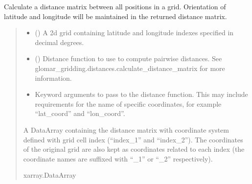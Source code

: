 \documentclass[letterpaper,10pt,english]{sphinxmanual}
\begin{document}
\begin{fulllineitems}
\label{\detokenize{covariance:glomar_gridding.grid.grid_to_distance_matrix}}
\pysigstartsignatures
\pysiglinewithargsret
{}
{\sphinxparamcomma {}\sphinxparamcomma {}}
{}
\pysigstopsignatures
\sphinxAtStartPar
Calculate a distance matrix between all positions in a grid. Orientation of
latitude and longitude will be maintained in the returned distance matrix.
\begin{quote}\begin{description}
\begin{itemize}
\item {}
\sphinxAtStartPar
{} () \textendash{} A 2\sphinxhyphen{}d grid containing latitude and longitude indexes specified in
decimal degrees.

\item {}
\sphinxAtStartPar
{} () \textendash{} Distance function to use to compute pairwise distances. See
glomar\_gridding.distances.calculate\_distance\_matrix for more
information.

\item {}
\sphinxAtStartPar
{} \textendash{} Keyword arguments to pass to the distance function. This may include
requirements for the name of specific coordinates, for example
“lat\_coord” and “lon\_coord”.

\end{itemize}

\sphinxAtStartPar
{} \textendash{} A DataArray containing the distance matrix with coordinate system
defined with grid cell index (“index\_1” and “index\_2”). The coordinates
of the original grid are also kept as coordinates related to each
index (the coordinate names are suffixed with “\_1” or “\_2”
respectively).

\sphinxAtStartPar
xarray.DataArray

\end{description}\end{quote}

\end{fulllineitems}
\end{document}

